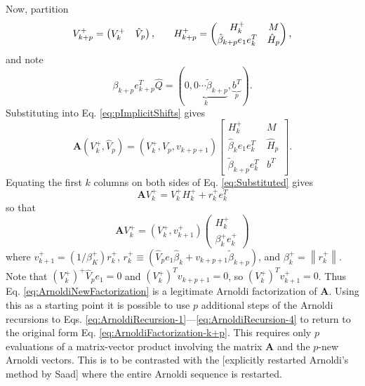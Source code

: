 \documentclass[12pt]{article}
\newcommand{\A}{\mathbf{A}}
\begin{document}
Now, partition
\begin{equation}
    V_{k+p}^+ = \begin{pmatrix}V_k^+ & \hat{V}_p\end{pmatrix},\hspace{.25in} H_{k+p}^+ = \begin{pmatrix} H_k^+ & M \\ \hat{\beta}_{k+p}e_1e_k^T & \hat{H}_p \end{pmatrix},
    \label{}
\end{equation}
and note
\begin{equation}
    \beta_{k+p}e_{k+p}^T\hat{Q} = \left(\underbrace{0,0 \cdots \tilde{\beta}_{k+p} }_k,\underbrace{b^T}_p\right).
    \label{}
\end{equation}
Substituting into Eq. \ref{eq:pImplicitShifts} gives
\begin{equation}
    \A \left( V_k^+ , \hat{V}_p \right) = \left(V_k^+, \hat{V}_p, v_{k+p+1}\right)
    \begin{bmatrix}
        H_k^+ & M \\
        \hat{\beta}_ke_1e_k^T & \hat{H}_p \\
        \tilde{\beta}_{k+p}e_k^T & b^T
    \end{bmatrix}.
    \label{eq:Substituted}
\end{equation}
Equating the first $k$ columns on both sides of Eq. \ref{eq:Substituted} gives
\begin{equation}
    \A V_k^+ = V_k^+H_k^+ + r_k^+e_k^T
    \label{}
\end{equation}
so that
\begin{equation}
    \A V_k^+ = \left(V_k^+, v_{k+1}^+\right)
    \begin{pmatrix}
        H_k^+ \\
        \beta_k^+e_k^+
    \end{pmatrix}
    \label{eq:ArnoldiNewFactorization}
\end{equation}
where $v_{k+1}^+ = \left(1/\beta_K^+\right)r_k^+$, $r_k^+ \equiv \left(\hat{V}_pe_1\hat{\beta}_k + v_{k+p+1}\tilde{\beta}_{k+p} \right)$, and $\beta_k^+ = \left\|r_k^+\right\|$.  Note that $\left(V_k^+\right)^+\hat{V}_pe_1 = 0$ and $\left(V_k^+\right)^Tv_{k+p+1} = 0$, so $\left(V_k^+\right)^Tv_{k+1}^+ = 0$.  Thus Eq. \ref{eq:ArnoldiNewFactorization} is a legitimate Arnoldi factorization of $\A$.  Using this as a starting point it is possible to use $p$ additional steps of the Arnoldi recursions to Eqs. \ref{eq:ArnoldiRecursion-1}---\ref{eq:ArnoldiRecursion-4} to return to the original form Eq. \ref{eq:ArnoldiFactorization-k+p}.  This requires only $p$ evaluations of a matrix-vector product involving the matrix $\A$ and the $p$-new Arnoldi vectors.  This is to be contrasted with the [explicitly restarted Arnoldi's method by Saad] where the entire Arnoldi sequence is restarted.  
\end{document}
